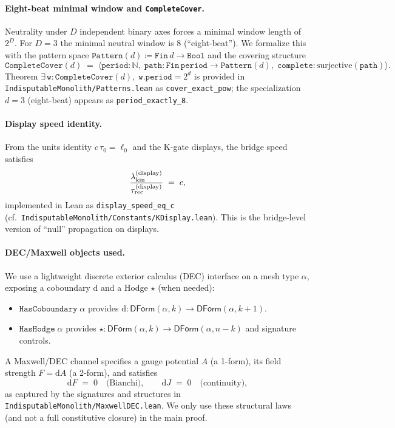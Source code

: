 \documentclass[12pt,a4paper]{article}
\begin{document}
\paragraph{Eight-beat minimal window and \texttt{CompleteCover}.}
Neutrality under \(D\) independent binary axes forces a minimal window length of \(2^D\). For \(D=3\) the minimal neutral window is \(8\) (``eight-beat''). We formalize this with the pattern space \(\texttt{Pattern}(d)\coloneqq \texttt{Fin}\,d\to \texttt{Bool}\) and the covering structure
\[
  \texttt{CompleteCover}(d)
  \;=\;
  \bigl\langle \texttt{period}:\mathbb{N},\;\texttt{path}:\texttt{Fin}\,\texttt{period}\to \texttt{Pattern}(d),\;\texttt{complete}:\text{surjective}(\texttt{path}) \bigr\rangle.
\]
Theorem \(\exists\,\texttt{w}:\texttt{CompleteCover}(d),\;\texttt{w.period}=2^d\) is provided in \texttt{IndisputableMonolith/Patterns.lean} as \texttt{cover\_exact\_pow}; the specialization \(d=3\) (eight-beat) appears as \texttt{period\_exactly\_8}.

\paragraph{Display speed identity.}
From the units identity \(c\,\tau_0=\ell_0\) and the K-gate displays, the bridge speed satisfies
\begin{equation}
  \frac{\lambda_{\rm kin}^{\rm (display)}}{\tau_{\rm rec}^{\rm (display)}} \;=\; c,
\end{equation}
implemented in Lean as \texttt{display\_speed\_eq\_c} (cf.\ \texttt{IndisputableMonolith/Constants/KDisplay.lean}). This is the bridge-level version of ``null'' propagation on displays.

\paragraph{DEC/Maxwell objects used.}
We use a lightweight discrete exterior calculus (DEC) interface on a mesh type \(\alpha\), exposing a coboundary \(\mathrm{d}\) and a Hodge \(\star\) (when needed):
\begin{itemize}
  \item \(\texttt{HasCoboundary}\;\alpha\) provides \(\mathrm{d}:\mathsf{DForm}(\alpha,k)\to \mathsf{DForm}(\alpha,k{+}1)\).
  \item \(\texttt{HasHodge}\;\alpha\) provides \(\star:\mathsf{DForm}(\alpha,k)\to \mathsf{DForm}(\alpha,n{-}k)\) and signature controls.
\end{itemize}
A Maxwell/DEC channel specifies a gauge potential \(A\) (a 1-form), its field strength \(F=\mathrm{d}A\) (a 2-form), and satisfies
\begin{equation}
  \mathrm{d}F \;=\; 0 \quad\text{(Bianchi)},\qquad
  \mathrm{d}J \;=\; 0 \quad\text{(continuity)},
\end{equation}
as captured by the signatures and structures in \texttt{IndisputableMonolith/MaxwellDEC.lean}. We only use these structural laws (and not a full constitutive closure) in the main proof.
\end{document}
